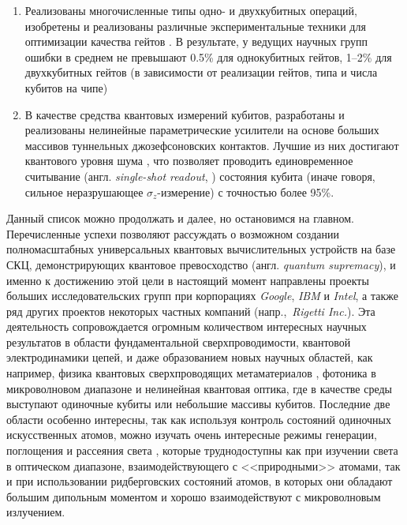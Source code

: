 \begin{enumerate}
	\item Реализованы многочисленные типы одно- и двухкубитных \cite{majer2007coupling} операций, изобретены и реализованы различные экспериментальные техники для оптимизации качества гейтов \cite{knill2008randomized, magesan2011scalable,motzoi2009simple}. В результате, у ведущих научных групп ошибки в среднем не превышают 0.5\% для однокубитных гейтов, 1--2\% для двухкубитных гейтов (в зависимости от реализации гейтов, типа и числа кубитов на чипе)
	\item В качестве средства квантовых измерений кубитов, разработаны и реализованы нелинейные параметрические усилители на основе больших массивов туннельных джозефсоновских контактов. Лучшие из них достигают квантового уровня шума \cite{castellanos2007widely,macklin2015near}, что позволяет проводить единовременное считывание (англ. \textit{single-shot readout}, \cite{mallet2009single}) состояния кубита (иначе говоря, сильное неразрушающее $\sigma_z$-измерение) с точностью более 95\%.
\end{enumerate}
Данный список можно продолжать и далее, но остановимся на главном. Перечисленные успехи позволяют рассуждать о возможном создании полномасштабных универсальных квантовых вычислительных устройств на базе СКЦ, демонстрирующих квантовое превосходство \cite{arute2019quantum} (англ. \textit{quantum supremacy}), и именно к достижению этой цели в настоящий момент направлены проекты больших исследовательских групп при корпорациях \textit{Google}, \textit{IBM} и \textit{Intel}, а также ряд других проектов некоторых частных компаний (напр.,~\textit{Rigetti Inc.}). Эта деятельность сопровождается огромным количеством интересных научных результатов в области фундаментальной сверхпроводимости, квантовой электродинамики цепей, и даже образованием новых научных областей, как например, физика квантовых сверхпроводящих метаматериалов \cite{castellanos2008amplification,macha2014implementation,zagoskin2012superconducting}, фотоника в микроволновом диапазоне \cite{hofheinz2008generation-Fock-states,lang2013correlations,peng2016tuneable} и нелинейная квантовая оптика, где в качестве среды выступают одиночные кубиты или небольшие массивы кубитов. Последние две области особенно интересны, так как используя контроль состояний одиночных искусственных атомов, можно изучать очень интересные режимы генерации, поглощения и рассеяния света \cite{Toyli2016ResSqueez,Wallraff_entangledPhotons,Astafiev2010resonance}, которые труднодоступны как при изучении света в оптическом диапазоне, взаимодействующего с <<природными>> атомами, так и при использовании ридберговских состояний атомов, в которых они обладают большим дипольным моментом и хорошо взаимодействуют с микроволновым излучением.

